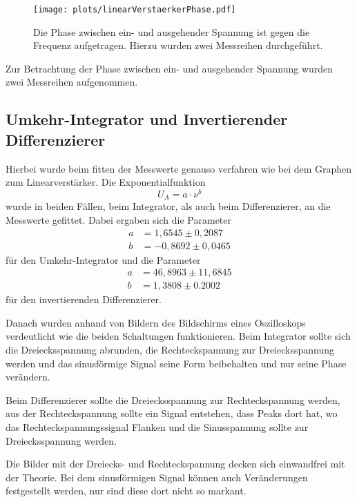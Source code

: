     \begin{figure}[ht]
        \centering
        \texttt{[image: plots/linearVerstaerkerPhase.pdf]}
        \caption{Die Phase zwischen ein- und ausgehender Spannung ist gegen die Frequenz aufgetragen. Hierzu wurden zwei Messreihen durchgeführt.}
        \label{fig:linearVerstaerkerPhase}
    \end{figure}

    Zur Betrachtung der Phase zwischen ein- und ausgehender Spannung wurden zwei Messreihen aufgenommen.

\newpage
\subsection{Umkehr-Integrator und Invertierender Differenzierer}

    Hierbei wurde beim fitten der Messwerte genauso verfahren wie bei dem Graphen zum Linearverstärker.
    Die Exponentialfunktion
    \begin{equation*}
        U_A = a \cdot \nu^{b}
    \end{equation*}
    wurde in beiden Fällen, beim Integrator, als auch beim Differenzierer, an die Messwerte gefittet.
    Dabei ergaben sich die Parameter
    \begin{align*}
        a &= 1,6545 \pm 0,2087 \\
        b &= -0,8692 \pm 0,0465
    \end{align*}
    für den Umkehr-Integrator und die Parameter
    \begin{align*}
        a &= 46,8963 \pm 11,6845 \\
        b &= 1,3808 \pm 0.2002
    \end{align*}
    für den invertierenden Differenzierer.

    \par
    Danach wurden anhand von Bildern des Bildschirms eines Oszilloskops verdeutlicht wie die beiden Schaltungen funktionieren.
    Beim Integrator sollte sich die Dreiecksspannung abrunden, die Rechteckspannung zur Dreiecksspannung werden und das sinusförmige Signal seine Form beibehalten und nur seine Phase verändern.

    Beim Differenzierer sollte die Dreiecksspannung zur Rechteckspannung werden, aus der Rechteckspannung sollte ein Signal entstehen, dass Peaks dort hat, wo das Rechteckspannungssignal Flanken und die Sinusspannung sollte zur Dreiecksspannung werden.

    Die Bilder mit der Dreiecks- und Rechteckspannung decken sich einwandfrei mit der Theorie.
    Bei dem sinusförmigen Signal können auch Veränderungen festgestellt werden, nur sind diese dort nicht so markant.

